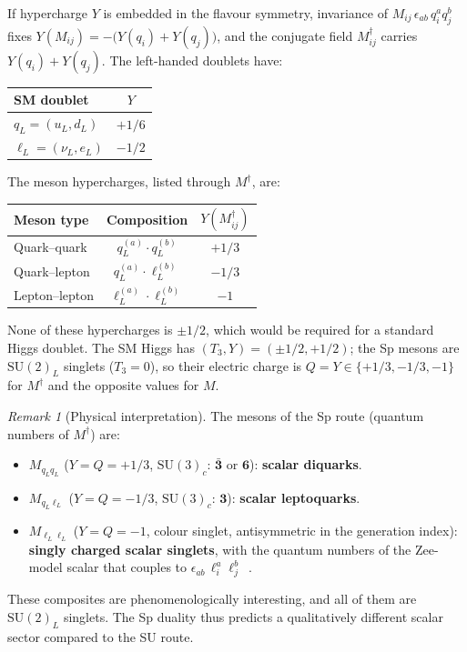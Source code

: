 \documentclass[11pt,a4paper]{article}
\theoremstyle{plain}
\theoremstyle{definition}
\theoremstyle{remark}
\newtheorem{remark}[theorem]{Remark}
\newcommand{\SU}[1]{\mathrm{SU}(#1)}
\begin{document}
If hypercharge $Y$ is embedded in the flavour symmetry, invariance of
$M_{ij}\,\epsilon_{ab}\, q_i^a q_j^b$ fixes
$Y(M_{ij}) = -\bigl(Y(q_i) + Y(q_j)\bigr)$, and the conjugate field
$M_{ij}^\dagger$ carries $Y(q_i) + Y(q_j)$.  The left-handed doublets
have:
\begin{center}
\renewcommand{\arraystretch}{1.3}
\begin{tabular}{l c}
\toprule
SM doublet & $Y$ \\
\midrule
$q_L = (u_L, d_L)$ & $+1/6$ \\
$\ell_L = (\nu_L, e_L)$ & $-1/2$ \\
\bottomrule
\end{tabular}
\end{center}
The meson hypercharges, listed through $M^\dagger$, are:
\begin{center}
\renewcommand{\arraystretch}{1.3}
\begin{tabular}{l c c}
\toprule
Meson type & Composition & $Y(M^\dagger_{ij})$ \\
\midrule
Quark--quark & $q_L^{(a)} \cdot q_L^{(b)}$ & $+1/3$ \\
Quark--lepton & $q_L^{(a)} \cdot \ell_L^{(b)}$ & $-1/3$ \\
Lepton--lepton & $\ell_L^{(a)} \cdot \ell_L^{(b)}$ & $-1$ \\
\bottomrule
\end{tabular}
\end{center}

None of these hypercharges is $\pm 1/2$, which would be required for
a standard Higgs doublet.  The SM Higgs has $(T_3, Y) = (\pm 1/2,
+1/2)$; the Sp mesons are $\SU{2}_L$ singlets ($T_3 = 0$), so their
electric charge is $Q = Y \in \{+1/3, -1/3, -1\}$ for $M^\dagger$ and the
opposite values for $M$.

\begin{remark}[Physical interpretation]
\label{rem:diquark}
The mesons of the Sp route (quantum numbers of $M^\dagger$) are:
\begin{itemize}
  \item $M_{q_L q_L}$ ($Y = Q = +1/3$, $\SU{3}_c$: $\bar{\mathbf{3}}$
    or $\mathbf{6}$): \textbf{scalar diquarks}.
  \item $M_{q_L \ell_L}$ ($Y = Q = -1/3$, $\SU{3}_c$: $\mathbf{3}$):
    \textbf{scalar leptoquarks}.
  \item $M_{\ell_L \ell_L}$ ($Y = Q = -1$, colour singlet, antisymmetric
    in the generation index): \textbf{singly charged scalar singlets},
    with the quantum numbers of the Zee-model scalar that couples to
    $\epsilon_{ab}\,\ell_i^a \ell_j^b$~\cite{Zee1980}.
\end{itemize}
These composites are phenomenologically interesting, and all of them are
$\SU{2}_L$ singlets.  The Sp duality thus predicts a qualitatively
different scalar sector compared to the SU route.
\end{remark}
\end{document}
